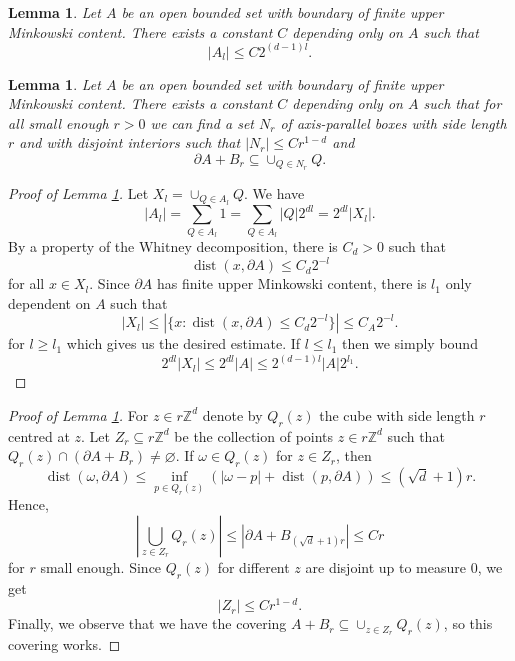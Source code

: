 \documentclass[12pt]{amsart}
\numberwithin{equation}{section}
\newcommand{\Z}{\mathbb{Z}}
\newcommand{\R}{\mathbb{R}}
\newtheorem{lemma}[Thm]{Lemma}
\begin{document}
\begin{lemma}\label{shell size}
Let $A$ be an open bounded set with boundary of finite upper Minkowski content. There exists a constant $C$ depending only on $A$ such that
\[
|A_l| \leq C 2^{(d-1)l}.
\]
\end{lemma}
\begin{lemma}\label{shell size boundary}
Let $A$ be an open bounded set with boundary of finite upper Minkowski content. There exists a constant $C$ depending only on $A$ such that for all small enough $r > 0$ we can find a set $N_r$ of axis-parallel boxes with side length $r$ and with disjoint interiors such that $|N_r| \le Cr^{1-d}$ and 
$$\partial A + B_r \subseteq\cup_{Q\in N_r} Q.$$
\end{lemma}
\begin{proof}[Proof of Lemma \ref{shell size}]
Let $X_l = \cup_{Q\in A_l} Q$. We have
\[
|A_l| = \sum_{Q\in A_l} 1 = \sum_{Q\in A_l} |Q| 2^{dl} = 2^{dl} |X_l|. 
\]
By a property of the Whitney decomposition, there is $C_d>0$ such that
\[
\operatorname{dist}(x, \partial A) \leq C_d 2^{-l}
\]
for all $x\in X_l$. Since $\partial A$ has finite upper Minkowski content, there is $l_1$ only dependent on $A$ such that
\[
|X_l| \leq |\{x: \operatorname{dist}(x, \partial A) \leq C_d 2^{-l}\}| \leq C_A 2^{-l}.
\]
for $l\geq l_1$ which gives us the desired estimate. If $l\leq l_1$ then we simply bound
\[
2^{dl}|X_l| \leq 2^{dl} |A| \leq 2^{(d-1)l} |A| 2^{l_1}. 
\]
\end{proof}
\begin{proof}[Proof of Lemma \ref{shell size boundary}]
For $z\in r \Z^d$ denote by $Q_r(z)$ the cube with side length $r$ centred at $z$. Let $Z_r \subseteq r\Z^d$ be the collection of points $z\in r\Z^d$ such that $Q_r(z) \cap (\partial A + B_r) \neq \varnothing$. If $\omega \in Q_r(z)$ for $ z\in Z_r$, then 
\[
\operatorname{dist}(\omega,\partial A) \leq \inf_{p\in Q_r(z)}(|\omega - p| + \operatorname{dist}(p,\partial A)) \leq (\sqrt{d} +1) r. 
\]
Hence,
\[
\left\lvert  \bigcup_{z\in Z_r} Q_r(z) \right\rvert \leq |\partial A + B_{(\sqrt{d} +1)r}| \leq C r  
\]
for $r$ small enough. Since $Q_r(z)$ for different $z$ are disjoint up to measure $0$, we get $$|Z_r|\le Cr^{1-d}.$$
Finally, we observe that we have the covering $A+B_r \subseteq \cup_{z\in Z_r} Q_r(z)$, so this covering works.

\end{proof}
\end{document}
